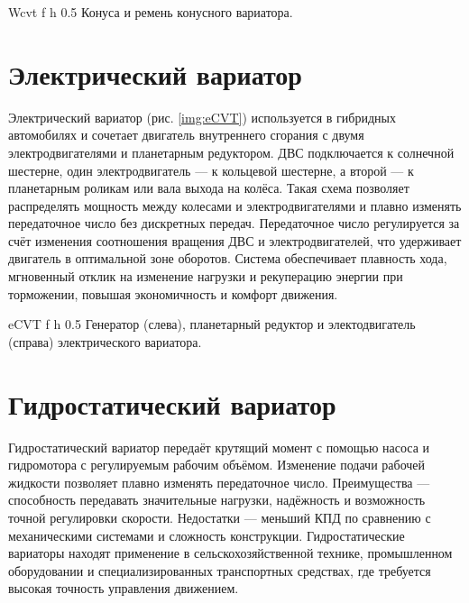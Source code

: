     {Wcvt} %
    {f} %
    {h} %
    {0.5\textwidth} %
    {Конуса и ремень конусного вариатора.} %

\section{Электрический вариатор}

Электрический вариатор (рис. \ref{img:eCVT}) используется в гибридных автомобилях и сочетает двигатель внутреннего сгорания с двумя электродвигателями и планетарным редуктором. ДВС подключается к солнечной шестерне, один электродвигатель — к кольцевой шестерне, а второй — к планетарным роликам или вала выхода на колёса. Такая схема позволяет распределять мощность между колесами и электродвигателями и плавно изменять передаточное число без дискретных передач. Передаточное число регулируется за счёт изменения соотношения вращения ДВС и электродвигателей, что удерживает двигатель в оптимальной зоне оборотов. Система обеспечивает плавность хода, мгновенный отклик на изменение нагрузки и рекуперацию энергии при торможении, повышая экономичность и комфорт движения.

    {eCVT} %
    {f} %
    {h} %
    {0.5\textwidth} %
    {Генератор (слева), планетарный редуктор и электодвигатель (справа) электрического вариатора.} %

\section{Гидростатический вариатор}

Гидростатический вариатор передаёт крутящий момент с помощью насоса и гидромотора с регулируемым рабочим объёмом. Изменение подачи рабочей жидкости позволяет плавно изменять передаточное число. Преимущества — способность передавать значительные нагрузки, надёжность и возможность точной регулировки скорости. Недостатки — меньший КПД по сравнению с механическими системами и сложность конструкции. Гидростатические вариаторы находят применение в сельскохозяйственной технике, промышленном оборудовании и специализированных транспортных средствах, где требуется высокая точность управления движением.

